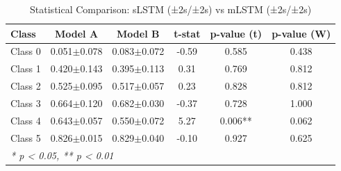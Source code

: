 \begin{table}[htbp]
\centering
\caption{Statistical Comparison: sLSTM (±2s/±2s) vs mLSTM (±2s/±2s)}
\label{tab:comparison_class_slstm_±2s_±2s_vs_mlstm_±2s_±2s}
\begin{tabular}{lccccc}
\toprule
\textbf{Class} & \textbf{Model A} & \textbf{Model B} & \textbf{t-stat} & \textbf{p-value (t)} & \textbf{p-value (W)} \\
\midrule
Class 0 & 0.051$\pm$0.078 & 0.083$\pm$0.072 & -0.59 & 0.585 & 0.438 \\
Class 1 & 0.420$\pm$0.143 & 0.395$\pm$0.113 & 0.31 & 0.769 & 0.812 \\
Class 2 & 0.525$\pm$0.095 & 0.517$\pm$0.057 & 0.23 & 0.828 & 0.812 \\
Class 3 & 0.664$\pm$0.120 & 0.682$\pm$0.030 & -0.37 & 0.728 & 1.000 \\
Class 4 & 0.643$\pm$0.057 & 0.550$\pm$0.072 & 5.27 & 0.006** & 0.062 \\
Class 5 & 0.826$\pm$0.015 & 0.829$\pm$0.040 & -0.10 & 0.927 & 0.625 \\
\bottomrule
\multicolumn{6}{l}{\textit{* p < 0.05, ** p < 0.01}} \\
\end{tabular}
\end{table}